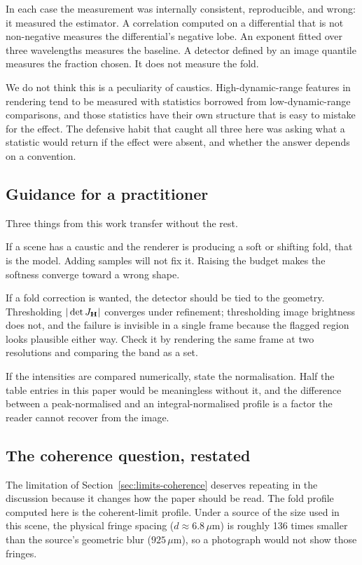 In each case the measurement was internally consistent, reproducible, and wrong:
it measured the estimator. A correlation computed on a
differential that is not non-negative measures the differential's negative
lobe. An exponent fitted over three wavelengths measures the baseline. A
detector defined by an image quantile measures the fraction chosen. It does not measure the fold.

We do not think this is a peculiarity of caustics. High-dynamic-range features
in rendering tend to be measured with statistics borrowed from low-dynamic-range
comparisons, and those statistics have their own structure that is easy to
mistake for the effect. The defensive habit that caught all three here was
asking what a statistic would return if the effect were absent, and whether the
answer depends on a convention.

\subsection{Guidance for a practitioner}
\label{sec:disc-guidance}

Three things from this work transfer without the rest.

If a scene has a caustic and the renderer is producing a soft or shifting fold,
that is the model. Adding samples will not fix it. Raising the budget makes the softness converge toward a wrong shape.

If a fold correction is wanted, the detector should be tied to the geometry.
Thresholding $|\det J_{\mathbf{H}}|$ converges under refinement; thresholding image brightness
does not, and the failure is invisible in a single frame because the flagged
region looks plausible either way. Check it by rendering the same
frame at two resolutions and comparing the band as a set.

If the intensities are compared numerically, state the normalisation. Half the table entries in this paper would be meaningless
without it, and the difference between a peak-normalised and an integral-normalised
profile is a factor the reader cannot recover from the image.

\subsection{The coherence question, restated}
\label{sec:disc-coherence}

The limitation of Section~\ref{sec:limits-coherence} deserves repeating in the
discussion because it changes how the paper should be read. The fold profile
computed here is the coherent-limit profile. Under a source of the size used in
this scene, the physical fringe spacing ($d \approx 6.8\,\mu\text{m}$) is roughly \num{136} times smaller than the
source's geometric blur ($925\,\mu\text{m}$), so a photograph would not show those fringes.

